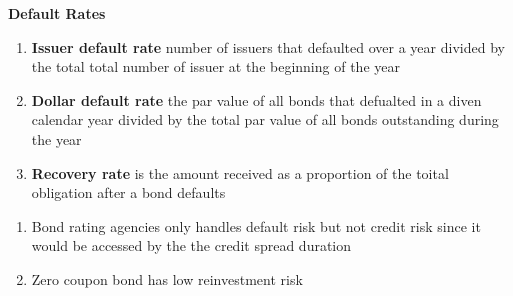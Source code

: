 \documentclass[11pt,fleqn]{book} %
\numberwithin{equation}{section} %
\numberwithin{figure}{section} %
\numberwithin{table}{section} %
\begin{document}
\begin{definition}\textbf{Default Rates}
    \begin{enumerate}
        \item \textbf{Issuer default rate} number of issuers that defaulted over a year divided by the total
        total number of issuer at the beginning of the year
        \item \textbf{Dollar default rate} the par value of all bonds that defualted in a diven calendar year
        divided by the total par value of all bonds outstanding during the year
        \item \textbf{Recovery rate} is the amount received as a proportion of the toital obligation
        after a bond defaults
    \end{enumerate}
\end{definition}
\begin{remark}
    \begin{enumerate}
        \item Bond rating agencies only handles default risk but not credit risk since it would be accessed by the
        the credit spread duration
        \item Zero coupon bond has low reinvestment risk
    \end{enumerate}
\end{remark}
\end{document}
